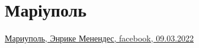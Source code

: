  
 
 
 
 
\section{Маріуполь}

\hyperlink{09_03_2022.fb.menendes_enrike.1.mariupol}{%
Мариуполь, Энрике Менендес, facebook, 09.03.2022
}
